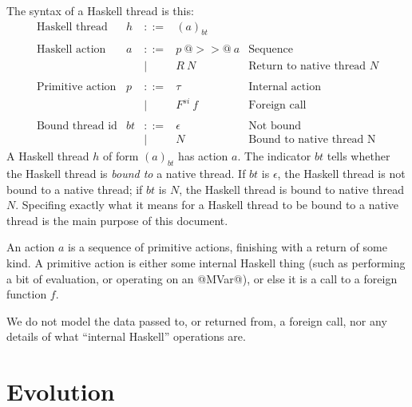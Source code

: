 \documentclass{article}
\newcommand{\fcall}[2]{F^{#1}~#2}
\newcommand{\ret}[1]{R~#1}
\begin{document}
The syntax of a Haskell thread is this:
$$
\begin{array}{lrcll}
\mbox{Haskell thread} &  h & ::= & (a)_{bt} \\
\\
\mbox{Haskell action} &  a & ::= & p ~@>>@~ a  & \mbox{Sequence} \\
	& & | & \ret{N}  & \mbox{Return to native thread $N$} \\
\\
\mbox{Primitive action} &  p & ::= & \tau & \mbox{Internal action} \\
	& & | & \fcall{si}{f} & \mbox{Foreign call} \\
\\
\mbox{Bound thread id} & bt & ::= & \epsilon & \mbox{Not bound} \\
	& & | & N & \mbox{Bound to native thread N}
\end{array}
$$
A Haskell thread $h$ of form $(a)_{bt}$ has action $a$.  The indicator
$bt$ tells whether the Haskell thread is \emph{bound to} a native
thread.  If $bt$ is $\epsilon$, the Haskell thread is not bound to a
native thread; if $bt$ is $N$, the Haskell thread is bound to native
thread $N$.  Specifing exactly what it means for a Haskell thread to
be bound to a native thread is the main purpose of this document.

An action $a$ is a sequence of primitive actions, finishing with a 
return of some kind.  A primitive action is either some internal Haskell
thing (such as performing a bit of evaluation, or operating on an @MVar@),
or else it is a call to a foreign function $f$.

We do not model the data passed to, or returned from, a foreign call, nor
any details of what ``internal Haskell'' operations are.  

\section{Evolution}
\end{document}
